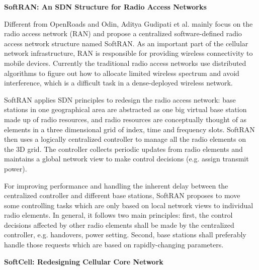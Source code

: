 \documentclass[english]{tktltiki}
\begin{document}
\vspace{1mm}

\textbf{SoftRAN: An SDN Structure for Radio Access Networks}

\vspace{1mm}

Different from OpenRoads and Odin, Aditya Gudipati et al. \cite{gplk13} mainly focus on the radio access network (RAN) and propose a centralized software-defined radio access network structure named SoftRAN. As an important part of the cellular network infrastructure, RAN is responsible for providing wireless connectivity to mobile devices. Currently the traditional radio access networks use distributed algorithms to figure out how to allocate limited wireless spectrum and avoid interference, which  is a difficult task in a dense-deployed wireless network. 

SoftRAN applies SDN principles to redesign the radio access network: base stations in one geographical area are abstracted as one big virtual base station made up of radio resources, and radio resources are conceptually thought of as elements in a three dimensional grid of index, time and frequency slots. SoftRAN then uses a logically centralized controller to manage all the radio elements on the 3D grid. The controller collects periodic updates from radio elements and maintains a global network view to make control decisions (e.g. assign transmit power).

For improving performance and handling the inherent delay between the centralized controller and different base stations, SoftRAN proposes to move some controlling tasks which are only based on local network views to individual radio elements. In general, it follows two main principles: first, the control decisions affected by other radio elements shall be made by the centralized controller, e.g. handovers, power setting. Second, base stations shall preferably handle those requests which are based on rapidly-changing parameters.

\vspace{1mm}

\textbf{SoftCell: Redesigning Cellular Core Network}

\vspace{1mm}
\end{document}
